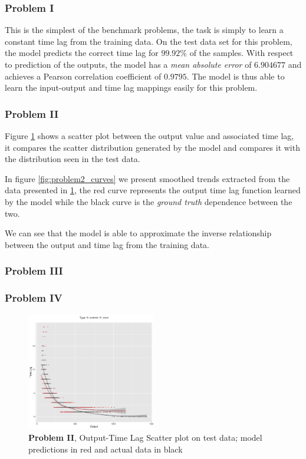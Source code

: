 \documentclass[twoside]{article}
\begin{document}
\subsubsection{Problem I}

This is the simplest of the benchmark problems, the task is simply to learn a constant time lag from the training data. On the test data set for this problem, the model predicts the correct time lag for $99.92\%$ of the samples. With respect to prediction of the outputs, the model has a \emph{mean absolute error} of $6.904677$ and achieves a Pearson correlation coefficient of $0.9795$. The model is thus able to learn the input-output and time lag mappings easily for this problem.

\subsubsection{Problem II}

Figure \ref{fig:problem2_scatter} shows a scatter plot between the output value and associated time lag, it compares the scatter distribution generated by the model and compares it with the distribution seen in the test data. 

In figure \ref{fig:problem2_curves} we present smoothed trends extracted from the data presented in \ref{fig:problem2_scatter}, the red curve represents the output time lag function learned by the model while the black curve is the \emph{ground truth} dependence between the two. 

We can see that the model is able to approximate the inverse relationship between the output and time lag from the training data.

\subsubsection{Problem III}



\subsubsection{Problem IV}


\begin{figure}[h]
\vspace{.3in}
\centerline{\includegraphics[width=0.5\textwidth]{figures/exp2_scatter_v_tl.png}}
\vspace{.3in}
\caption{\textbf{Problem II}, Output-Time Lag Scatter plot on test data; model predictions in red and actual data in black}
\label{fig:problem2_scatter}
\end{figure}
\end{document}
